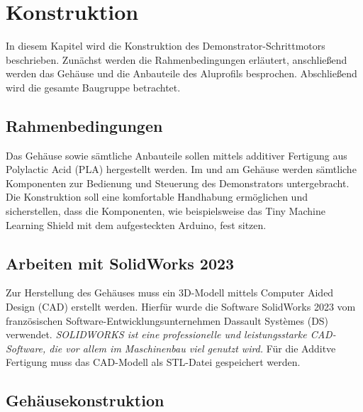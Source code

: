 %
%
%

\chapter{Konstruktion}

In diesem Kapitel wird die Konstruktion des Demonstrator-Schrittmotors beschrieben. Zunächst werden die Rahmenbedingungen erläutert, anschließend werden das Gehäuse und die Anbauteile des Aluprofils besprochen. Abschließend wird die gesamte Baugruppe betrachtet.

\section{Rahmenbedingungen}

Das Gehäuse sowie sämtliche Anbauteile sollen mittels additiver Fertigung aus Polylactic Acid (PLA) hergestellt werden. Im und am Gehäuse werden sämtliche Komponenten zur Bedienung und Steuerung des Demonstrators untergebracht. Die Konstruktion soll eine komfortable Handhabung ermöglichen und sicherstellen, dass die Komponenten, wie beispielsweise das Tiny Machine Learning Shield mit dem aufgesteckten Arduino, fest sitzen.

\section{Arbeiten mit SolidWorks 2023}

Zur Herstellung des Gehäuses muss ein 3D-Modell mittels Computer Aided Design (CAD) erstellt werden. Hierfür wurde die Software SolidWorks 2023 vom französischen Software-Entwicklungsunternehmen Dassault Systèmes (DS) verwendet. \glqq \textit{SOLIDWORKS ist eine professionelle und leistungsstarke CAD-Software, die vor allem im Maschinenbau viel genutzt wird.}\grqq \cite[S.225]{Weber.2024} Für die Additve Fertigung muss das CAD-Modell als STL-Datei gespeichert werden. 

\section{Gehäusekonstruktion}

